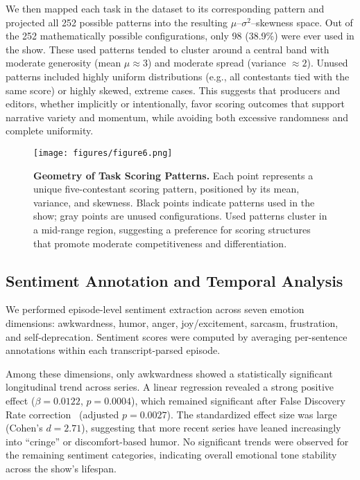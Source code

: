 \documentclass[10pt,letterpaper]{article}
\begin{document}
We then mapped each task in the dataset to its corresponding pattern and projected all 252 possible patterns into the resulting $\mu$–$\sigma^2$–skewness space. Out of the 252 mathematically possible configurations, only 98 (38.9\%) were ever used in the show. These used patterns tended to cluster around a central band with moderate generosity (mean $\mu \approx 3$) and moderate spread (variance $\approx 2$). Unused patterns included highly uniform distributions (e.g., all contestants tied with the same score) or highly skewed, extreme cases. This suggests that producers and editors, whether implicitly or intentionally, favor scoring outcomes that support narrative variety and momentum, while avoiding both excessive randomness and complete uniformity.

\begin{figure}[!h]
\centering
\texttt{[image: figures/figure6.png]}
\caption{{\bf Geometry of Task Scoring Patterns.}
Each point represents a unique five-contestant scoring pattern, positioned by its mean, variance, and skewness. Black points indicate patterns used in the show; gray points are unused configurations. Used patterns cluster in a mid-range region, suggesting a preference for scoring structures that promote moderate competitiveness and differentiation.}
\label{fig:scoring_geometry}
\end{figure}
\FloatBarrier



\subsection*{Sentiment Annotation and Temporal Analysis}

We performed episode-level sentiment extraction across seven emotion dimensions: awkwardness, humor, anger, joy/excitement, sarcasm, frustration, and self-deprecation. Sentiment scores were computed by averaging per-sentence annotations within each transcript-parsed episode.

Among these dimensions, only awkwardness showed a statistically significant longitudinal trend across series. A linear regression revealed a strong positive effect ($\beta = 0.0122$, $p = 0.0004$), which remained significant after False Discovery Rate correction~\cite{Benjamini1995} (adjusted $p = 0.0027$). The standardized effect size was large (Cohen’s $d = 2.71$), suggesting that more recent series have leaned increasingly into “cringe” or discomfort-based humor. No significant trends were observed for the remaining sentiment categories, indicating overall emotional tone stability across the show’s lifespan.
\end{document}
